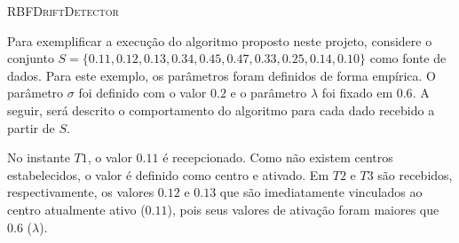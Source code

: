 \documentclass[qual, classic, a4paper]{ufbathesis}
\begin{document}
\vspace{7pt}
\begin{algorithm}[H]
    \SetAlgoLined

    \caption{\textsc{RBFDriftDetector}}
    \label{alg:algoritmo} 
\end{algorithm}
\vspace{7pt}

Para exemplificar a execução do algoritmo proposto neste projeto, considere o conjunto $S = \{0.11, 0.12, 0.13, 0.34, 0.45, 0.47, 0.33, 0.25, 0.14, 0.10\}$ como fonte de dados.
Para este exemplo, os parâmetros foram definidos de forma empírica. O parâmetro \textit{$\sigma$} foi definido com o valor $0.2$ e o parâmetro \textit{$\lambda$} foi fixado em $0.6$.
A seguir, será descrito o comportamento do algoritmo para cada dado recebido a partir de $S$.

No instante $T1$, o valor $0.11$ é recepcionado. Como não existem centros estabelecidos, o valor é definido como centro e ativado.
Em $T2$ e $T3$ são recebidos, respectivamente, os valores $0.12$ e $0.13$ que são imediatamente vinculados ao centro atualmente ativo ($0.11$), pois seus valores de ativação foram maiores que $0.6$ ($\lambda$).
\end{document}
